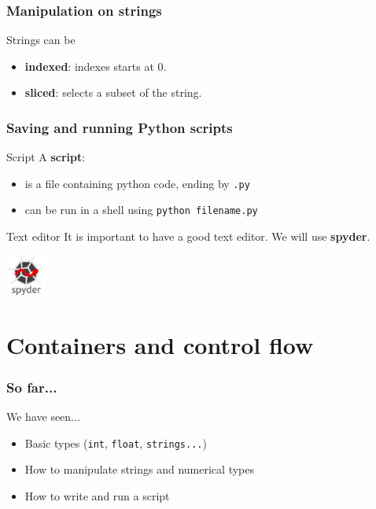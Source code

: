 \documentclass[xcolor=dvipsnames]{beamer}
\begin{document}
\begin{frame}
\frametitle{Manipulation on strings}
Strings can be
\begin{itemize}
\item \textbf{indexed}: indexes starts at 0.

\item \textbf{sliced}: selects a subset of the string.

\end{itemize}
\end{frame}

\begin{frame}
\frametitle{Saving and running Python scripts}
\begin{block}{Script}
A \textbf{script}:
\begin{itemize}
\item is a file containing python code, ending by \texttt{.py}
\item can be run in a shell using \texttt{python filename.py}
\end{itemize}
\end{block}

\begin{alertblock}{Text editor}
It is important to have a good text editor. We will use \textbf{spyder}.
\begin{center}
\includegraphics[width=50px]{images/spyder.jpg}
\end{center}
\end{alertblock}
\end{frame}

\section{Containers and control flow}
\begin{frame}
\frametitle{So far...}
\begin{block}{We have seen...}
\begin{itemize}
\item Basic types (\texttt{int}, \texttt{float}, \texttt{strings...})
\item How to manipulate strings and numerical types
\item How to write and run a script
\end{itemize}
\end{block}
\end{frame}
\end{document}
